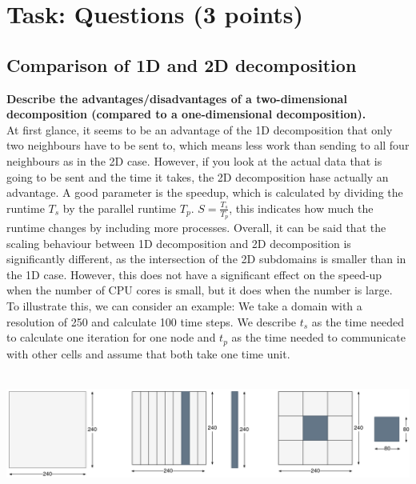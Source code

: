 \documentclass[10pt,a4paper]{article}
\begin{document}
\cfoot{\pagemark}

\section{Task: Questions (3 points)}

\subsection{Comparison of 1D and 2D decomposition}

\textbf{Describe the advantages/disadvantages of a two-dimensional decomposition (compared to a one-dimensional decomposition).}\\

At first glance, it seems to be an advantage of the 1D decomposition that only two neighbours have to be sent to, which 
means less work than sending to all four neighbours as in the 2D case. However, if you look at the actual data that is going 
to be sent and the time it takes, the 2D decomposition hase actually an advantage. A good parameter is the speedup, 
which is calculated by dividing the runtime $T_s$ by the parallel runtime $T_p$. $S = \frac{T_s}{T_p}$, this indicates 
how much the runtime changes by including more processes. Overall, it can be said that the scaling behaviour 
between 1D decomposition and 2D decomposition is significantly different, as the intersection of the 2D subdomains is 
smaller than in the 1D case. However, this does not have a significant effect on the speed-up when the number of CPU 
cores is small, but it does when the number is large. \\


To illustrate this, we can consider an example: We take a domain with a resolution of 250 and calculate 100 time steps. 
We describe $t_s$ as the time needed to calculate one iteration for one node and $t_p$ as the time needed to communicate 
with other cells and assume that both take one time unit. \\
\\
\begin{center}
\includegraphics[width=14.5cm]{images/Task.png}
\end{center}
\end{document}
